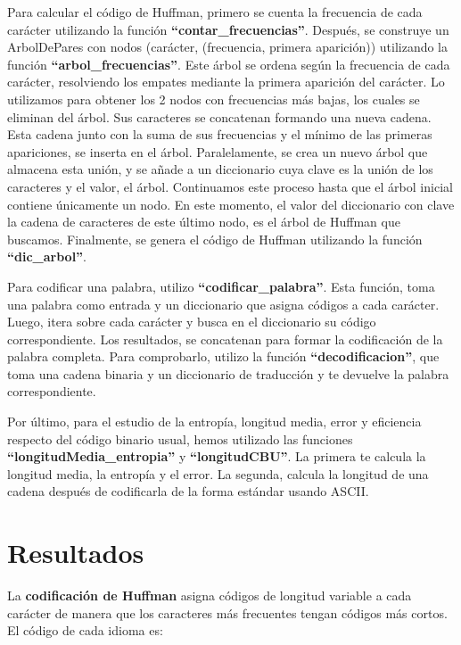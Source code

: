 \documentclass[a4paper]{article}
\begin{document}
\bigskip


Para calcular el código de Huffman, primero se cuenta la frecuencia de cada carácter utilizando la función \textbf{``contar\_frecuencias''}. Después, se construye un ArbolDePares con nodos (carácter, (frecuencia, primera aparición)) utilizando la función \textbf{``arbol\_frecuencias''}. Este árbol se ordena según la frecuencia de cada carácter, resolviendo los empates mediante la primera aparición del carácter. Lo utilizamos para obtener los 2 nodos con frecuencias más bajas, los cuales se eliminan del árbol. Sus caracteres se concatenan formando una nueva cadena. Esta cadena junto con la suma de sus frecuencias y el mínimo de las primeras apariciones, se inserta en el árbol. Paralelamente, se crea un nuevo árbol que almacena esta unión, y se añade a un diccionario cuya clave es la unión de los caracteres y el valor, el árbol. Continuamos este proceso hasta que el árbol inicial contiene únicamente un nodo. En este momento, el valor del diccionario con clave la cadena de caracteres de este último nodo, es el árbol de Huffman que buscamos. Finalmente, se genera el código de Huffman utilizando la función \textbf{``dic\_arbol''}.

\bigskip

Para codificar una palabra, utilizo \textbf{``codificar\_palabra''}. Esta función, toma una palabra como entrada y un diccionario que asigna códigos a cada carácter. Luego, itera sobre cada carácter y busca en el diccionario su código correspondiente. Los resultados, se concatenan para formar la codificación de la palabra completa. Para comprobarlo,  utilizo la función \textbf{``decodificacion''}, que toma una cadena binaria y un diccionario de traducción y te devuelve la palabra correspondiente.

\bigskip

Por último, para el estudio de la entropía, longitud media, error y eficiencia respecto del código binario usual, hemos utilizado las funciones \textbf{``longitudMedia\_entropia''} y \textbf{``longitudCBU''}. La primera te calcula la longitud media, la entropía y el error. La segunda, calcula la longitud de una cadena después de codificarla de la forma estándar usando ASCII. 


\section{Resultados}

La \textbf{codificación de Huffman} asigna códigos de longitud variable a cada carácter de manera que los caracteres más frecuentes tengan códigos más cortos. El código de cada idioma es:
\end{document}
